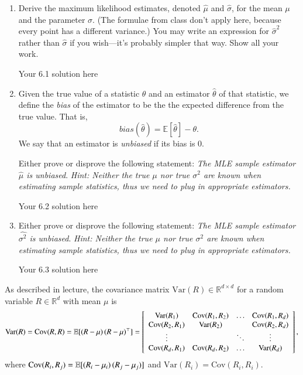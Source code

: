 \documentclass[11pt]{article}
\begin{document}
\begin{enumerate}

\item Derive the maximum likelihood estimates, denoted $\hat{\mu}$ and $\hat{\sigma}$, for the mean $\mu$ and the parameter $\sigma$. (The formulae from class don't apply here, because every point has a different variance.) You may write an expression for $\hat{\sigma}^2$ rather than $\hat{\sigma}$ if you wish---it's probably simpler that way.  Show all your work.

\begin{solution}
Your 6.1 solution here
\end{solution}
\item Given the true value of a statistic $\theta$ and an estimator $\hat{\theta}$ of that statistic, we define the \textit{bias} of the estimator to be the the expected difference from the true value. That is,
$$bias(\hat{\theta}) = \mathbb{E}[\hat{\theta}] - \theta.$$
We say that an estimator is \textit{unbiased} if its bias is $0$.

Either prove or disprove the following statement: \textit{The MLE sample estimator $\hat{\mu}$ is unbiased}.
\emph{Hint: Neither the true $\mu$ nor true $\sigma^2$ are known when estimating sample statistics, thus we need to plug in appropriate estimators.}

\begin{solution}
Your 6.2 solution here
\end{solution}
\item
Either prove or disprove the following statement: \textit{The MLE sample estimator $\hat{\sigma^2}$ is unbiased}.
\emph{Hint: Neither the true $\mu$ nor true $\sigma^2$ are known when estimating sample statistics, thus we need to plug in appropriate estimators.}

\begin{solution}
Your 6.3 solution here
\end{solution}
\end{enumerate}

\newcommand{\Var}{\mathrm{Var}}
\newcommand{\Cov}{\mathrm{Cov}}

As described in lecture, the covariance matrix $\Var(R) \in \mathbb{R}^{d \times d}$ for a random variable $R \in \mathbb{R}^d$ with mean $\mu$ is
\[
\Var(R) = \Cov(R, R) = \E[(R - \mu) \, (R - \mu)^\top] =
\left[ \begin{array}{cccc}
\Var(R_1)      & \Cov(R_1, R_2) & \ldots & \Cov(R_1, R_d)  \\
\Cov(R_2, R_1) & \Var(R_2)      &        & \Cov(R_2, R_d)  \\
\vdots         &                & \ddots & \vdots          \\
\Cov(R_d, R_1) & \Cov(R_d, R_2) & \ldots & \Var(R_d)
\end{array} \right],
\]
where $\Cov(R_i, R_j) = \E[(R_i - \mu_i) \, (R_j - \mu_j)]$ and
$\Var(R_i) = \Cov(R_i, R_i)$.
\end{document}
